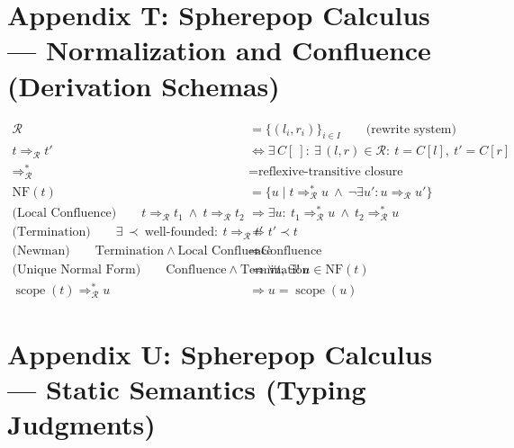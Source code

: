 \documentclass[11pt,oneside]{article}
\begin{document}
\section{Appendix T: Spherepop Calculus --- Normalization and Confluence (Derivation Schemas)}

\begin{align}
\mathcal{R} &= \{(l_i,r_i)\}_{i\in I} \qquad \text{(rewrite system)} \\[10pt]

t \Rightarrow_{\mathcal{R}} t'
&\Longleftrightarrow
\exists\, C[\ ]:\ \exists\,(l,r)\in\mathcal{R}:\ t=C[l],\ t'=C[r]
\\[14pt]

\Rightarrow_{\mathcal{R}}^{\ast}
&=
\text{reflexive-transitive closure}
\\[14pt]

\mathrm{NF}(t)
&=
\{u \mid t\Rightarrow_{\mathcal{R}}^{\ast}u\ \wedge\ \neg\exists u': u\Rightarrow_{\mathcal{R}} u'\}
\\[14pt]

\text{(Local Confluence)}
\qquad
t\Rightarrow_{\mathcal{R}} t_1\ \wedge\ t\Rightarrow_{\mathcal{R}} t_2
&\Longrightarrow
\exists u:\ t_1\Rightarrow_{\mathcal{R}}^{\ast}u\ \wedge\ t_2\Rightarrow_{\mathcal{R}}^{\ast}u
\\[14pt]

\text{(Termination)}
\qquad
\exists\, \prec\ \text{well-founded}:\ 
t\Rightarrow_{\mathcal{R}} t'
&\Longrightarrow
t' \prec t
\\[14pt]

\text{(Newman)}
\qquad
\text{Termination} \ \wedge\ \text{Local Confluence}
&\Longrightarrow
\text{Confluence}
\\[14pt]

\text{(Unique Normal Form)}
\qquad
\text{Confluence} \ \wedge\ \text{Termination}
&\Longrightarrow
\forall t,\ \exists!\ u\in \mathrm{NF}(t)
\\[14pt]

\operatorname{scope}(t) \Rightarrow_{\mathcal{R}}^{\ast} u
&\Longrightarrow
u = \operatorname{scope}(u)
\end{align}

\section{Appendix U: Spherepop Calculus --- Static Semantics (Typing Judgments)}
\end{document}
